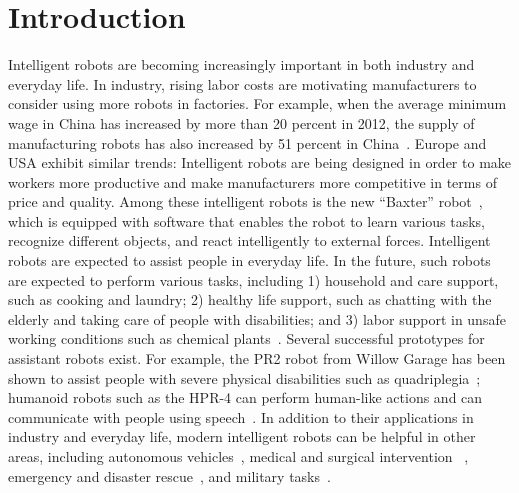 \chapter{Introduction}
\label{chp:intro}
Intelligent robots are becoming increasingly important in both industry and everyday life. In industry, rising labor costs are motivating manufacturers to consider using more robots in factories. For example, when the average minimum wage in China has increased by more than 20 percent in 2012, the supply of manufacturing robots has also increased by 51 percent in China~\cite{IFR:report}. 
Europe and USA exhibit similar trends: Intelligent robots are being designed in order to make workers more productive and make manufacturers more competitive in terms of price and quality. Among these intelligent robots is the new ``Baxter'' robot~\cite{Brooks:2012:Baxter}, which is equipped with software that enables the robot to learn various tasks, recognize different objects, and react intelligently to external forces. Intelligent robots are expected to assist people in everyday life. In the future, such robots are expected to perform various tasks, including 1) household and care support, such as cooking and laundry; 2) healthy life support, such as chatting with the elderly and taking care of people with disabilities; and 3) labor support in unsafe working conditions such as chemical plants~\cite{Yamazaki:2012}. Several successful prototypes for assistant robots exist. For example, the PR2 robot from Willow Garage has been shown to assist people with severe physical disabilities such as quadriplegia~\cite{PR2HumanityWeb}; humanoid robots such as the HPR-4 can perform human-like actions and can communicate with people using speech~\cite{HRP-Cyber}. In addition to their applications in industry and everyday life, modern intelligent robots can be helpful in other areas, including autonomous vehicles~\cite{Montemerlo:2008:JSE}, medical and surgical intervention ~\cite{Bonfe:2012}, emergency and disaster rescue~\cite{Fukushima:2011}, and military tasks~\cite{AlphaDog:2012}.



